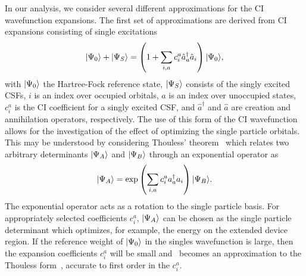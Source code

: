 In our analysis, we consider several different approximations for the CI
wavefunction expansions. The first set of approximations are derived from
CI expansions consisting of single excitations 
\begin{equation} 
\label{eq:singles}
  |\Psi_0 \rangle + |\Psi_{S} \rangle
  =
  \left(1 + \sum_{i,a} c_i^a \hat{a}_a^\dagger \hat{a}_i \right) |\Psi_0 \rangle,
\end{equation} 
with $|\Psi_0 \rangle$ the Hartree-Fock reference state, $|\Psi_{S} \rangle$
consists of the singly excited CSFs, $i$ is an index over occupied
orbitals, $a$ is an index over unoccupied states, $c_i^a$ is the CI
coefficient for a singly excited CSF, and $\hat{a}^\dagger$ and $\hat{a}$
are creation and annihilation operators, respectively. The use of this
form of the CI wavefunction allows for the investigation of the effect
of optimizing the single particle orbitals. This may be understood by
considering Thouless' theorem~\cite{thouless} which relates two arbitrary
determinants $|\Psi_A \rangle$ and $|\Psi_B \rangle$ through  an exponential
operator as
\begin{equation}
\label{eq:thouless}
|\Psi_A \rangle = \exp \left( \sum_{i,a} c_i^a a_a^\dagger a_i \right) |\Psi_B \rangle.
\end{equation}     
The exponential operator acts as a rotation to the single particle basis.
For appropriately selected coefficients $c_i^a$, $|\Psi_A \rangle$ can be
chosen as the single particle determinant which optimizes, for example,
the energy on the extended device region. If the reference weight of
$|\Psi_0 \rangle$ in the singles wavefunction is large, then the expansion
coefficients $c_i^a$ will be small and~ becomes an
approximation to the Thouless form~, accurate to first
order in the $c_i^a$. 

